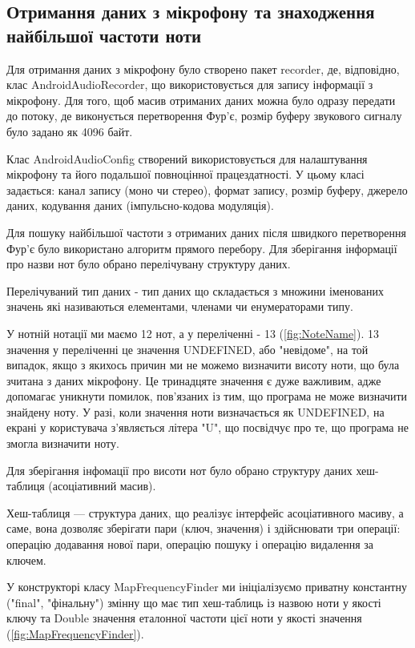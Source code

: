 \subsection{Отримання даних з мікрофону та знаходження найбільшої частоти ноти}

Для отримання даних з мікрофону було створено пакет recorder, де, відповідно, клас AndroidAudioRecorder, що використовується для запису інформації з мікрофону. Для того, щоб масив отриманих даних можна було одразу передати до потоку, де виконується перетворення Фур'є, розмір буферу звукового сигналу було задано як 4096 байт. 

Клас AndroidAudioConfig створений використовується для налаштування мікрофону та його подальшої повноцінної працездатності. У цьому класі задається: канал запису (моно чи стерео), формат запису, розмір буферу, джерело даних, кодування даних (імпульсно-кодова модуляція).

Для пошуку найбільшої частоти з отриманих даних після швидкого перетворення Фур'є було використано алгоритм прямого перебору. Для зберігання інформації про назви нот було обрано перелічувану структуру даних.

Перелічуваний тип даних - тип даних що складається з множини іменованих значень які називаються елементами, членами чи енумераторами типу.

У нотній нотації ми маємо 12 нот, а у переліченні - 13 (\ref{fig:NoteName}). 13 значення у переліченні це значення UNDEFINED, або "невідоме", на той випадок, якщо з якихось причин ми не можемо визначити висоту ноти, що була зчитана з даних мікрофону. 
Це тринадцяте значення є дуже важливим, адже допомагає уникнути помилок, пов'язаних із тим, що програма не може визначити знайдену ноту. У разі, коли значення ноти визначається як UNDEFINED, на екрані у користувача з'являється літера "U", що посвідчує про те, що програма не змогла визначити ноту.

Для зберігання інфомації про висоти нот було обрано структуру даних хеш-таблиця 
(асоціативний масив).

Хеш-таблиця — структура даних, що реалізує інтерфейс асоціативного масиву, а саме, вона дозволяє зберігати пари (ключ, значення) і здійснювати три операції: операцію додавання нової пари, операцію пошуку і операцію видалення за ключем.

У конструкторі класу MapFrequencyFinder ми ініціалізуємо приватну константну ("final", "фінальну") змінну що має тип хеш-таблиць із назвою ноти у якості ключу та Double значення еталонної частоти цієї ноти у якості значення (\ref{fig:MapFrequencyFinder}).



